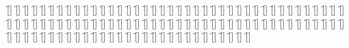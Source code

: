 \begin{questions}
\begin{multicols}{2}
        \question  \f[]
        \question  \f[]
        \question  \f[]
        \question  \f[]
        \question  \f[]
        \question  \f[]
        \question  \f[]
        \question  \f[]
        \question  \f[]
        \question  \f[]
        \question  \f[]
        \question  \f[]
        \question  \f[]
        \question  \f[]
        \question  \f[]
        \question  \f[]
        \question  \f[]
        \question  \f[]
        \question  \f[]
        \question  \f[]
        \question  \f[]
        \question  \f[]
        \question  \f[]
        \question  \f[]
        \question  \f[]
        \question  \f[]
        \question  \f[]
        \question  \f[]
        \question  \f[]
        \question  \f[]
        \question  \f[]
        \question  \f[]
        \question  \f[]
        \question  \f[]
        \question  \f[]
        \question  \f[]
        \question  \f[]
        \question  \f[]
        \question  \f[]
        \question  \f[]
        \question  \f[]
        \question  \f[]
        \question  \f[]
        \question  \f[]
        \question  \f[]
        \question  \f[]
        \question  \f[]
        \question  \f[]
        \question  \f[]
        \question  \f[]
        \question  \f[]
        \question  \f[]
        \question  \f[]
        \question  \f[]
        \question  \f[]
        \question  \f[]
        \question  \f[]
        \question  \f[]
        \question  \f[]
        \question  \f[]
        \question  \f[]
        \question  \f[]
        \question  \f[]
        \question  \f[]
        \question  \f[]
        \question  \f[]
        \question  \f[]
        \question  \f[]
        \question  \f[]
        \question  \f[]
        \question  \f[]
        \question  \f[]
        \question  \f[]
        \question  \f[]
        \question  \f[]
        \question  \f[]
        \question  \f[]
        \question  \f[]
        \question  \f[]
        \question  \f[]
        \question  \f[]
        \question  \f[]
        \question  \f[]
        \question  \f[]
        \question  \f[]
        \question  \f[]
        \question  \f[]
        \question  \f[]
        \question  \f[]
        \question  \f[]
        \question  \f[]
        \question  \f[]
        \question  \f[]
        \question  \f[]
        \question  \f[]
        \question  \f[]
        \question  \f[]
        \question  \f[]
        \question  \f[]
        \question  \f[]
        \question  \f[]
        \question  \f[]
        \question  \f[]
        \question  \f[]
        \question  \f[]
        \question  \f[]
        \question  \f[]
        \question  \f[]
        \question  \f[]

\end{multicols}
\end{questions}
